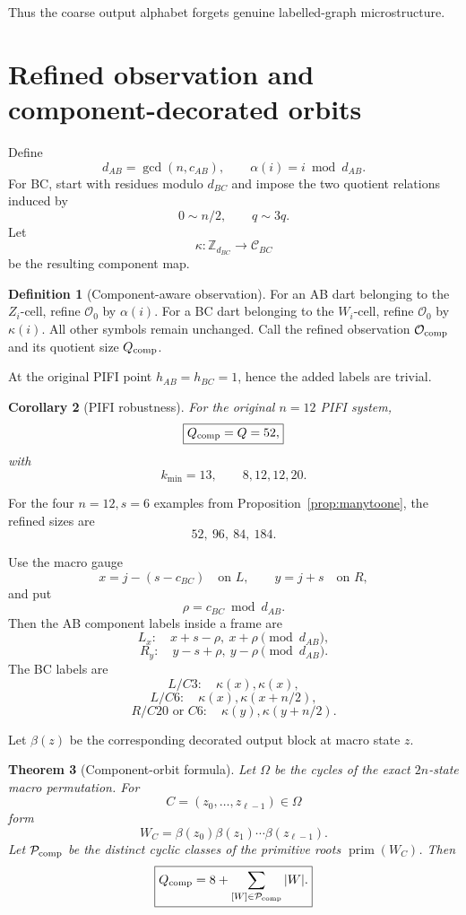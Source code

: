 \documentclass[11pt,a4paper]{article}
\newtheorem{theorem}{Theorem}
\newtheorem{corollary}[theorem]{Corollary}
\theoremstyle{definition}
\newtheorem{definition}[theorem]{Definition}
\newcommand{\ZZ}{\mathbb Z}
\newcommand{\Ozero}{\mathcal O_0}
\newcommand{\Ocomp}{\mathcal O_{\rm comp}}
\newcommand{\Pcomp}{\mathcal P_{\rm comp}}
\begin{document}
Thus the coarse output alphabet forgets genuine labelled-graph microstructure.

\section{Refined observation and component-decorated orbits}\label{sec:refined}

Define
\[
d_{AB}=\gcd(n,c_{AB}),
\qquad
\alpha(i)=i\bmod d_{AB}.
\]
For BC, start with residues modulo
\(
d_{BC}
\)
and impose the two quotient relations induced by
\[
0\sim n/2,\qquad q\sim3q.
\]
Let
\[
\kappa:\ZZ_{d_{BC}}\to\mathcal C_{BC}
\]
be the resulting component map.

\begin{definition}[Component-aware observation]
For an AB dart belonging to the \(Z_i\)-cell, refine \(\Ozero\) by \(\alpha(i)\).
For a BC dart belonging to the \(W_i\)-cell, refine \(\Ozero\) by \(\kappa(i)\).
All other symbols remain unchanged.
Call the refined observation \(\Ocomp\) and its quotient size \(Q_{\rm comp}\).
\end{definition}

At the original PIFI point
\(
h_{AB}=h_{BC}=1
\),
hence the added labels are trivial.

\begin{corollary}[PIFI robustness]
For the original \(n=12\) PIFI system,
\[
\boxed{Q_{\rm comp}=Q=52,}
\]
with
\[
k_{\min}=13,\qquad
8,12,12,20.
\]
\end{corollary}

For the four \(n=12,s=6\) examples from Proposition~\ref{prop:manytoone}, the refined sizes are
\[
52,\ 96,\ 84,\ 184.
\]

Use the macro gauge
\[
x=j-(s-c_{BC})\quad\text{on }L,
\qquad
y=j+s\quad\text{on }R,
\]
and put
\[
\boxed{\rho=c_{BC}\bmod d_{AB}.}
\]
Then the AB component labels inside a frame are
\[
L_x:\quad x+s-\rho,\ x+\rho\pmod{d_{AB}},
\]
\[
R_y:\quad y-s+\rho,\ y-\rho\pmod{d_{AB}}.
\]
The BC labels are
\[
L/C3:\quad \kappa(x),\kappa(x),
\]
\[
L/C6:\quad \kappa(x),\kappa(x+n/2),
\]
\[
R/C20\text{ or }C6:\quad \kappa(y),\kappa(y+n/2).
\]

Let \(\beta(z)\) be the corresponding decorated output block at macro state \(z\).

\begin{theorem}[Component-orbit formula]\label{thm:componentorbit}
Let \(\Omega\) be the cycles of the exact \(2n\)-state macro permutation.
For
\[
C=(z_0,\ldots,z_{\ell-1})\in\Omega
\]
form
\[
W_C=\beta(z_0)\beta(z_1)\cdots\beta(z_{\ell-1}).
\]
Let \(\Pcomp\) be the distinct cyclic classes of the primitive roots
\(
\operatorname{prim}(W_C)
\).
Then
\[
\boxed{
Q_{\rm comp}
=
8+\sum_{[W]\in\Pcomp}|W|.
}
\]
\end{theorem}
\end{document}
